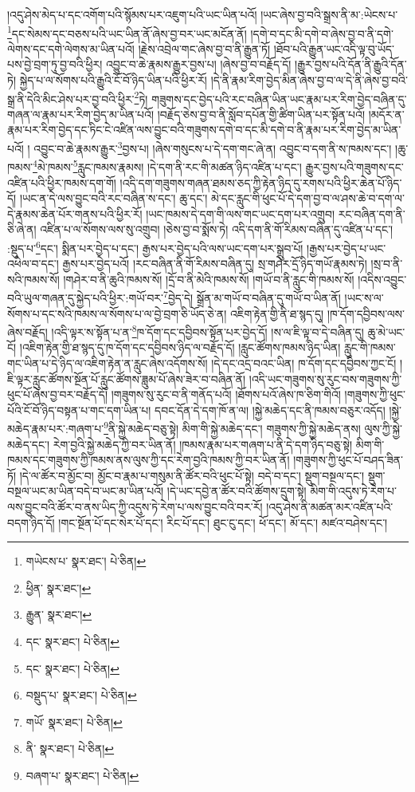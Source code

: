 །འདུ་ཤེས་མེད་པ་དང་འགོག་པའི་སྙོམས་པར་འཇུག་པའི་ཡང་ཡིན་པའོ། །ཡང་ཞེས་བྱ་བའི་སྒྲས་ནི་མ་:ཡེངས་པ་\footnote{གཡེངས་པ་  སྣར་ཐང་།  པེ་ཅིན། }དང་སེམས་དང་བཅས་པའི་ཡང་ཡིན་ནོ་ཞེས་བྱ་བར་ཡང་མངོན་ནོ། །དགེ་བ་དང་མི་དགེ་བ་ཞེས་བྱ་བ་ནི་དགེ་ལེགས་དང་དགེ་ལེགས་མ་ཡིན་པའོ། །རྗེས་འབྲེལ་གང་ཞེས་བྱ་བ་ནི་རྒྱུན་ཏོ། །ཐོབ་པའི་རྒྱུན་ཡང་འདི་ལྟ་བུ་ཡོད་པས་བྱེ་བྲག་ཏུ་བྱ་བའི་ཕྱིར། འབྱུང་བ་ཆེ་རྣམས་རྒྱུར་བྱས་པ། །ཞེས་བྱ་བ་བརྗོད་དོ། །རྒྱུར་བྱས་པའི་དོན་ནི་རྒྱུའི་དོན་ཏེ། སྐྱེད་པ་ལ་སོགས་པའི་རྒྱུའི་ངོ་བོ་ཉིད་ཡིན་པའི་ཕྱིར་རོ། །དེ་ནི་རྣམ་རིག་བྱེད་མིན་ཞེས་བྱ་བ་ལ་དེ་ནི་ཞེས་བྱ་བའི་སྒྲ་ནི་དེའི་མིང་ཤེས་པར་བྱ་བའི་ཕྱིར་\footnote{ཕྱིན་  སྣར་ཐང་། }ཏེ། གཟུགས་དང་བྱེད་པའི་རང་བཞིན་ཡིན་ཡང་རྣམ་པར་རིག་བྱེད་བཞིན་དུ་གཞན་ལ་རྣམ་པར་རིག་བྱེད་མ་ཡིན་པའོ། །བརྗོད་ཅེས་བྱ་བ་ནི་སློབ་དཔོན་གྱི་ཚིག་ཡིན་པར་སྟོན་པའོ། །མདོར་ན་རྣམ་པར་རིག་བྱེད་དང་ཏིང་ངེ་འཛིན་ལས་བྱུང་བའི་གཟུགས་དགེ་བ་དང་མི་དགེ་བ་ནི་རྣམ་པར་རིག་བྱེད་མ་ཡིན་པའོ། །
འབྱུང་བ་ཆེ་རྣམས་རྒྱུར་\footnote{རྒྱུན་  སྣར་ཐང་། }བྱས་པ། །ཞེས་གསུངས་པ་དེ་དག་གང་ཞེ་ན། འབྱུང་བ་དག་ནི་ས་ཁམས་དང་། །ཆུ་ཁམས་\footnote{དང་  སྣར་ཐང་།  པེ་ཅིན། }མེ་ཁམས་\footnote{དང་  སྣར་ཐང་།  པེ་ཅིན། }རླུང་ཁམས་རྣམས། །དེ་དག་ནི་རང་གི་མཚན་ཉིད་འཛིན་པ་དང་། རྒྱུར་བྱས་པའི་གཟུགས་དང་འཛིན་པའི་ཕྱིར་ཁམས་དག་གོ། །འདི་དག་གཟུགས་གཞན་ཐམས་ཅད་ཀྱི་རྟེན་ཉིད་དུ་རགས་པའི་ཕྱིར་ཆེན་པོ་ཉིད་དོ། །ཡང་ན་དེ་ལས་བྱུང་བའི་རང་བཞིན་ས་དང་། ཆུ་དང་། མེ་དང་རླུང་གི་ཕུང་པོ་དེ་དག་བྱ་བ་ལ་ཤས་ཆེ་བ་དག་ལ་དེ་རྣམས་ཆེན་པོར་གནས་པའི་ཕྱིར་རོ། །ཡང་ཁམས་དེ་དག་གི་ལས་གང་ཡང་དག་པར་འགྲུབ། རང་བཞིན་དག་ནི་ཅི་ཞེ་ན། འཛིན་པ་ལ་སོགས་ལས་སུ་འགྲུབ། །ཅེས་བྱ་བ་སྨོས་ཏེ། འདི་དག་ནི་གོ་རིམས་བཞིན་དུ་འཛིན་པ་དང་། :སྡུད་པ་\footnote{བསྡུད་པ་  སྣར་ཐང་།  པེ་ཅིན། }དང་། སྨིན་པར་བྱེད་པ་དང་། རྒྱས་པར་བྱེད་པའི་ལས་ཡང་དག་པར་སྒྲུབ་པོ། །རྒྱས་པར་བྱེད་པ་ཡང་འཕེལ་བ་དང་། རྒྱས་པར་བྱེད་པའོ། །རང་བཞིན་ནི་གོ་རིམས་བཞིན་དུ། སྲ་གཤེར་དྲོ་ཉིད་གཡོ་རྣམས་ཏེ། །སྲ་བ་ནི་སའི་ཁམས་སོ། །གཤེར་བ་ནི་ཆུའི་ཁམས་སོ། །དྲོ་བ་ནི་མེའི་ཁམས་སོ། །གཡོ་བ་ནི་རླུང་གི་ཁམས་སོ། །འདིས་འབྱུང་བའི་ཡུལ་གཞན་དུ་སྐྱེད་པའི་ཕྱིར་:གཡོ་བར་\footnote{གཡོ་  སྣར་ཐང་།  པེ་ཅིན། }བྱེད་དེ། སྒྲོན་མ་གཡོ་བ་བཞིན་དུ་གཡོ་བ་ཡིན་ནོ། །ཡང་ས་ལ་སོགས་པ་དང་སའི་ཁམས་ལ་སོགས་པ་ལ་བྱེ་བྲག་ཅི་ཡོད་ཅེ་ན། འཇིག་རྟེན་གྱི་ནི་ཐ་སྙད་དུ། །ཁ་དོག་དབྱིབས་ལས་ཞེས་བརྗོད། །འདི་ལྟར་ས་སྟོན་པ་ན་\footnote{ནི་  སྣར་ཐང་།  པེ་ཅིན། }ཁ་དོག་དང་དབྱིབས་སྟོན་པར་བྱེད་དོ། །ས་ལ་ཇི་ལྟ་བ་དེ་བཞིན་དུ། ཆུ་མེ་ཡང་ངོ། །འཇིག་རྟེན་གྱི་ཐ་སྙད་དུ་ཁ་དོག་དང་དབྱིབས་ཉིད་ལ་བརྗོད་དོ། །རླུང་ཚོགས་ཁམས་ཉིད་ཡིན། རླུང་གི་ཁམས་གང་ཡིན་པ་དེ་ཉིད་ལ་འཇིག་རྟེན་ན་རླུང་ཞེས་འདོགས་སོ། །དེ་དང་འདྲ་བའང་ཡིན། ཁ་དོག་དང་དབྱིབས་ཀྱང་ངོ། །ཇི་ལྟར་རླུང་ཚོགས་སྔོན་པོ་རླུང་ཚོགས་ཟླུམ་པོ་ཞེས་ཟེར་བ་བཞིན་ནོ། །འདི་ཡང་གཟུགས་སུ་རུང་བས་གཟུགས་ཀྱི་ཕུང་པོ་ཞེས་བྱ་བར་བརྗོད་དོ། །གཟུགས་སུ་རུང་བ་ནི་གནོད་པའོ། །ཐོགས་པའོ་ཞེས་ཁ་ཅིག་གིའོ། །གཟུགས་ཀྱི་ཕུང་པོའི་ངོ་བོ་ཉིད་བསྟན་པ་གང་དག་ཡིན་པ། དབང་དོན་དེ་དག་ཁོ་ན་ལ། །སྐྱེ་མཆེད་དང་ནི་ཁམས་བཅུར་འདོད། །སྐྱེ་མཆེད་རྣམ་པར་:གཞག་པ་\footnote{བཞག་པ་  སྣར་ཐང་།  པེ་ཅིན། }ནི་སྐྱེ་མཆེད་བཅུ་སྟེ། མིག་གི་སྐྱེ་མཆེད་དང་། གཟུགས་ཀྱི་སྐྱེ་མཆེད་ནས། ལུས་ཀྱི་སྐྱེ་མཆེད་དང་། རེག་བྱའི་སྐྱེ་མཆེད་ཀྱི་བར་ཡིན་ནོ། །ཁམས་རྣམ་པར་གཞག་པ་ནི་དེ་དག་ཉིད་བཅུ་སྟེ། མིག་གི་ཁམས་དང་གཟུགས་ཀྱི་ཁམས་ནས་ལུས་ཀྱི་དང་རེག་བྱའི་ཁམས་ཀྱི་བར་ཡིན་ནོ། །གཟུགས་ཀྱི་ཕུང་པོ་བཤད་ཟིན་ཏོ། །དེ་ལ་ཚོར་བ་མྱོང་བ། མྱོང་བ་རྣམ་པ་གསུམ་ནི་ཚོར་བའི་ཕུང་པོ་སྟེ། བདེ་བ་དང་། སྡུག་བསྔལ་དང་། སྡུག་བསྔལ་ཡང་མ་ཡིན་བདེ་བ་ཡང་མ་ཡིན་པའོ། །དེ་ཡང་དབྱེ་ན་ཚོར་བའི་ཚོགས་དྲུག་སྟེ། མིག་གི་འདུས་ཏེ་རེག་པ་ལས་བྱུང་བའི་ཚོར་བ་ནས་ཡིད་ཀྱི་འདུས་ཏེ་རེག་པ་ལས་བྱུང་བའི་བར་རོ། །འདུ་ཤེས་ནི་མཚན་མར་འཛིན་པའི་བདག་ཉིད་དོ། །གང་སྔོན་པོ་དང་སེར་པོ་དང་། རིང་པོ་དང་། ཐུང་ངུ་དང་། ཕོ་དང་། མོ་དང་། མཛའ་བཤེས་དང་། 